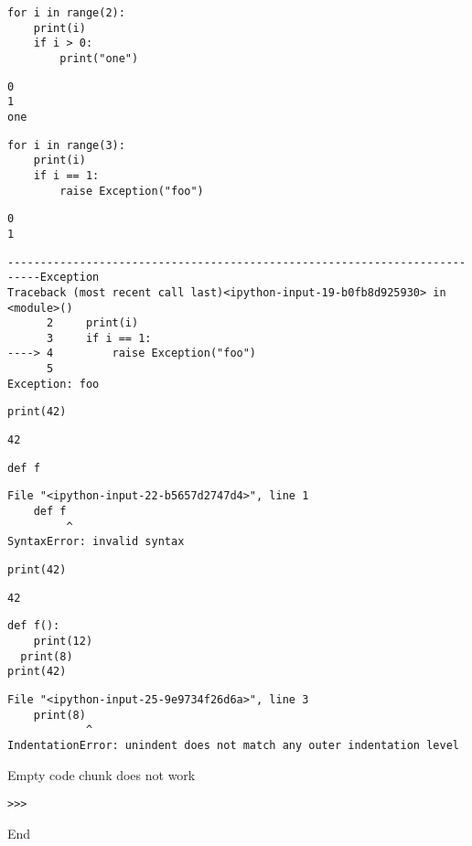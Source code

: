 \begin{verbatim}
for i in range(2):
    print(i)
    if i > 0:
        print("one")
\end{verbatim}
\begin{verbatim}
0
1
one
\end{verbatim}


\begin{verbatim}
for i in range(3):
    print(i)
    if i == 1:
        raise Exception("foo")
\end{verbatim}
\begin{verbatim}
0
1
\end{verbatim}
\begin{verbatim}
---------------------------------------------------------------------------Exception
Traceback (most recent call last)<ipython-input-19-b0fb8d925930> in
<module>()
      2     print(i)
      3     if i == 1:
----> 4         raise Exception("foo")
      5
Exception: foo
\end{verbatim}

\begin{verbatim}
print(42)
\end{verbatim}
\begin{verbatim}
42
\end{verbatim}


\begin{verbatim}
def f
\end{verbatim}
\begin{verbatim}
File "<ipython-input-22-b5657d2747d4>", line 1
    def f
         ^
SyntaxError: invalid syntax
\end{verbatim}

\begin{verbatim}
print(42)
\end{verbatim}
\begin{verbatim}
42
\end{verbatim}


\begin{verbatim}
def f():
    print(12)
  print(8)
print(42)
\end{verbatim}
\begin{verbatim}
File "<ipython-input-25-9e9734f26d6a>", line 3
    print(8)
            ^
IndentationError: unindent does not match any outer indentation level
\end{verbatim}

Empty code chunk does not work

\begin{verbatim}
>>>

\end{verbatim}

End

